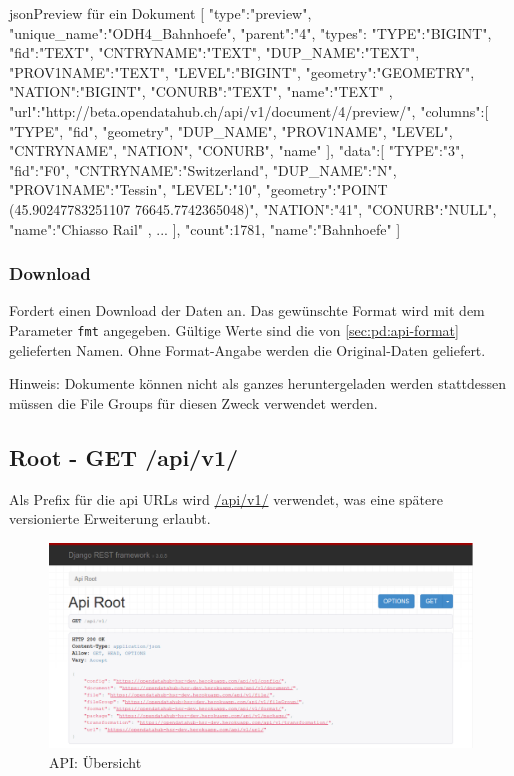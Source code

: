 \begin{srclst}{json}{Preview für ein Dokument}
[  
   {  
      "type":"preview",
      "unique_name":"ODH4_Bahnhoefe",
      "parent":"4",
      "types":{  
         "TYPE":"BIGINT",
         "fid":"TEXT",
         "CNTRYNAME":"TEXT",
         "DUP_NAME":"TEXT",
         "PROV1NAME":"TEXT",
         "LEVEL":"BIGINT",
         "geometry":"GEOMETRY",
         "NATION":"BIGINT",
         "CONURB":"TEXT",
         "name":"TEXT"
      },
      "url":"http://beta.opendatahub.ch/api/v1/document/4/preview/",
      "columns":[ "TYPE", "fid", "geometry", "DUP_NAME", "PROV1NAME", "LEVEL", "CNTRYNAME", "NATION", "CONURB", "name" ],
      "data":[  
         {  
            "TYPE":"3",
            "fid":"F0",
            "CNTRYNAME":"Switzerland",
            "DUP_NAME":"N",
            "PROV1NAME":"Tessin",
            "LEVEL":"10",
            "geometry":"POINT (45.90247783251107 76645.7742365048)",
            "NATION":"41",
            "CONURB":"NULL",
            "name":"Chiasso Rail"
         },
         ...
      ],
      "count":1781,
      "name":"Bahnhoefe"
   }
]
\end{srclst}

\subsubsection{Download} \label{sec:pd:api-download}
Fordert einen Download der Daten an. Das gewünschte Format wird mit dem Parameter \texttt{fmt} angegeben. Gültige Werte sind die von \cref{sec:pd:api-format} gelieferten Namen. Ohne Format-Angabe werden die Original-Daten geliefert.

Hinweis: Dokumente können nicht als ganzes heruntergeladen werden \textendash stattdessen müssen die File Groups für diesen Zweck verwendet werden.

\subsection{Root - GET /api/v1/}
Als Prefix für die \gls{api} URLs wird \url{/api/v1/} verwendet, was eine spätere versionierte Erweiterung erlaubt.
\begin{figure}[H]
\centering
\includegraphics[width=\linewidth]{fig/api-root}
\caption{API: Übersicht}
\label{fig:pd:api-root}
\end{figure}

